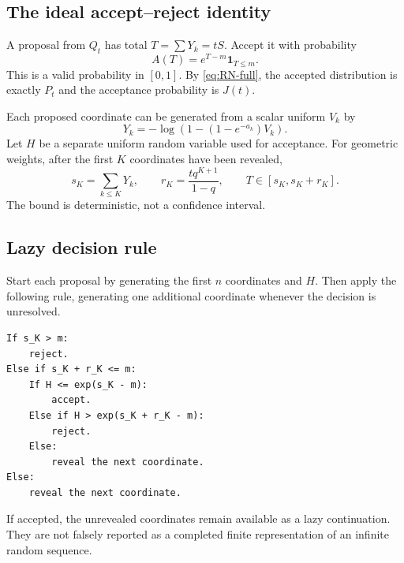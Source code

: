\documentclass[11pt,a4paper]{article}
\numberwithin{equation}{section}
\theoremstyle{definition}
\theoremstyle{remark}
\newcommand{\ind}{\mathbf 1}
\begin{document}
\subsection{The ideal accept--reject identity}
A proposal from $Q_t$ has total $T=\sum Y_k=tS$. Accept it with
probability
\begin{equation}\label{eq:accept}
 A(T)=e^{T-m}\ind_{T\le m}.
\end{equation}
This is a valid probability in $[0,1]$. By \cref{eq:RN-full}, the
accepted distribution is exactly $P_t$ and the acceptance
probability is $J(t)$.

Each proposed coordinate can be generated from a scalar uniform
$V_k$ by
\begin{equation}\label{eq:inverse-cdf}
 Y_k=-\log\left(1-(1-e^{-a_k})V_k\right).
\end{equation}
Let $H$ be a separate uniform random variable used for acceptance.
For geometric weights, after the first $K$ coordinates have been
revealed,
\begin{equation}\label{eq:tail-interval}
 s_K=\sum_{k\le K}Y_k,\qquad
 r_K=\frac{tq^{K+1}}{1-q},\qquad T\in[s_K,s_K+r_K].
\end{equation}
The bound is deterministic, not a confidence interval.

\subsection{Lazy decision rule}
Start each proposal by generating the first $n$ coordinates and
$H$. Then apply the following rule, generating one additional
coordinate whenever the decision is unresolved.
\begin{lstlisting}
If s_K > m:
    reject.
Else if s_K + r_K <= m:
    If H <= exp(s_K - m):
        accept.
    Else if H > exp(s_K + r_K - m):
        reject.
    Else:
        reveal the next coordinate.
Else:
    reveal the next coordinate.
\end{lstlisting}
If accepted, the unrevealed coordinates remain available as a lazy
continuation. They are not falsely reported as a completed finite
representation of an infinite random sequence.
\end{document}
